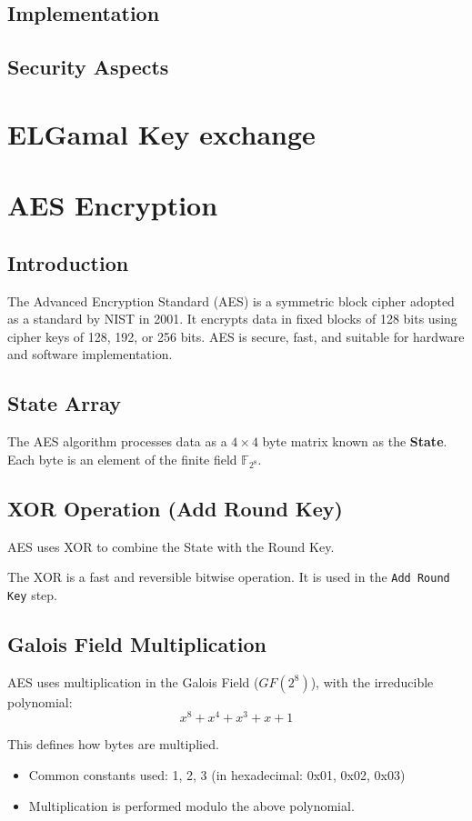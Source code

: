 \documentclass[12pt,a4paper]{report}
\begin{document}
\section{Implementation}
\section{Security Aspects}

\chapter{ELGamal Key exchange}
\chapter{AES Encryption}

\section{Introduction}
The Advanced Encryption Standard (AES) is a symmetric block cipher adopted as a standard by NIST in 2001. It encrypts data in fixed blocks of 128 bits using cipher keys of 128, 192, or 256 bits. AES is secure, fast, and suitable for hardware and software implementation.

\section{State Array}
The AES algorithm processes data as a $4 \times 4$ byte matrix known as the \textbf{State}. Each byte is an element of the finite field $\mathbb{F}_{2^8}$.

\section{XOR Operation (Add Round Key)}
AES uses XOR to combine the State with the Round Key.

The XOR is a fast and reversible bitwise operation. It is used in the \texttt{Add Round Key} step.

\section{Galois Field Multiplication}
AES uses multiplication in the Galois Field ($GF(2^8)$), with the irreducible polynomial:
\[
x^8 + x^4 + x^3 + x + 1
\]

This defines how bytes are multiplied. 
\begin{itemize}
    \item Common constants used: 1, 2, 3 (in hexadecimal: 0x01, 0x02, 0x03)
    \item Multiplication is performed modulo the above polynomial.
\end{itemize}
\end{document}
